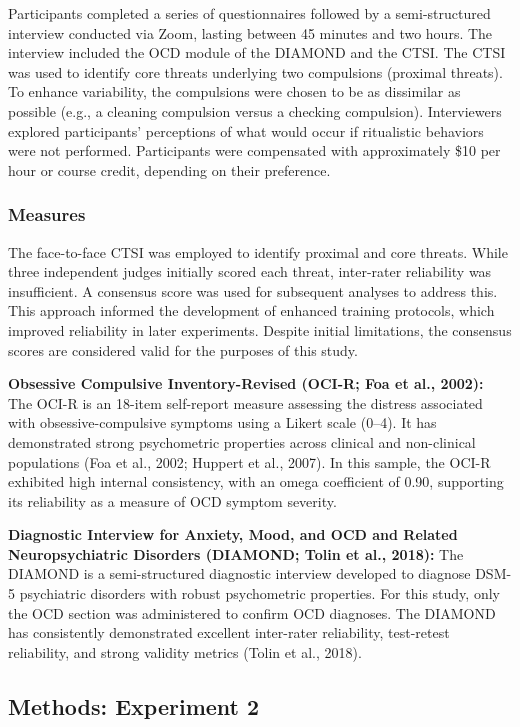 \documentclass[
  man,floatsintext]{apa7}
\begin{document}
Participants completed a series of questionnaires followed by a semi-structured interview conducted via Zoom, lasting between 45 minutes and two hours.
The interview included the OCD module of the DIAMOND and the CTSI.
The CTSI was used to identify core threats underlying two compulsions (proximal threats).
To enhance variability, the compulsions were chosen to be as dissimilar as possible (e.g., a cleaning compulsion versus a checking compulsion).
Interviewers explored participants' perceptions of what would occur if ritualistic behaviors were not performed.
Participants were compensated with approximately \$10 per hour or course credit, depending on their preference.

\subsubsection{Measures}\label{measures-1}

The face-to-face CTSI was employed to identify proximal and core threats.
While three independent judges initially scored each threat, inter-rater reliability was insufficient.
A consensus score was used for subsequent analyses to address this.
This approach informed the development of enhanced training protocols, which improved reliability in later experiments.
Despite initial limitations, the consensus scores are considered valid for the purposes of this study.

\textbf{Obsessive Compulsive Inventory-Revised (OCI-R; Foa et al., 2002):}
The OCI-R is an 18-item self-report measure assessing the distress associated with obsessive-compulsive symptoms using a Likert scale (0--4).
It has demonstrated strong psychometric properties across clinical and non-clinical populations (Foa et al., 2002; Huppert et al., 2007).
In this sample, the OCI-R exhibited high internal consistency, with an omega coefficient of 0.90, supporting its reliability as a measure of OCD symptom severity.

\textbf{Diagnostic Interview for Anxiety, Mood, and OCD and Related Neuropsychiatric Disorders (DIAMOND; Tolin et al., 2018):}
The DIAMOND is a semi-structured diagnostic interview developed to diagnose DSM-5 psychiatric disorders with robust psychometric properties.
For this study, only the OCD section was administered to confirm OCD diagnoses.
The DIAMOND has consistently demonstrated excellent inter-rater reliability, test-retest reliability, and strong validity metrics (Tolin et al., 2018).

\subsection{Methods: Experiment 2}\label{methods-experiment-2}
\end{document}
